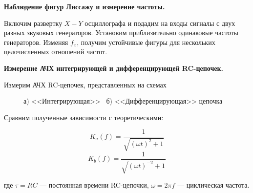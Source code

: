 \documentclass[14pt]{article}
\begin{document}
\vspace{0.5cm}
\textbf{Наблюдение фигур Лиссажу и измерение частоты.}

Включим развертку $X-Y$ осциллографа и подадим на входы сигналы с двух разных звуковых генераторов. Установим приблизительно одинаковые частоты генераторов. Изменяя $f_x$, получим устойчивые фигуры для нескольких целочисленных отношений частот. 

%
%

\vspace{0.5cm}
\textbf{Измерение АЧХ интегрирующей и дифференцирующей RC-цепочек.}

Измерим АЧХ RC-цепочек, представленных на схемах

\begin{figure}[h!]
	\caption{а) <<Интегрирующая>> ~б) <<Дифференцирующая>> цепочка}
	\label{fig:image}
\end{figure}

Сравним полученные зависимости с теоретическими:

$$K_a(f) = \frac{1}{\sqrt{(\omega t)^2 + 1}}$$
$$K_b(f) = \frac{1}{\sqrt{(\omega t)^{-2} + 1}}$$

\noindent где $\tau = RC$ --- постоянная времени RC-цепочки, $\omega = 2\pi f$ — циклическая
частота.

%
%
\end{document}

